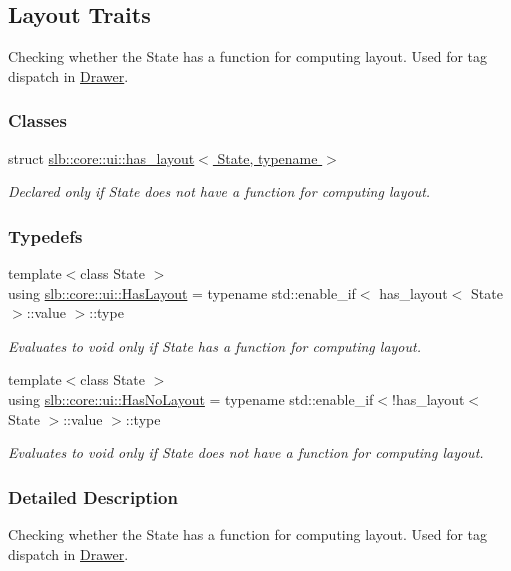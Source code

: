 \hypertarget{group__LayoutTraits}{}\subsection{Layout Traits}
\label{group__LayoutTraits}


Checking whether the State has a function for computing layout. Used for tag dispatch in \hyperlink{structslb_1_1core_1_1ui_1_1Drawer}{Drawer}.  


\subsubsection*{Classes}
\begin{DoxyCompactItemize}
\item 
struct \hyperlink{structslb_1_1core_1_1ui_1_1has__layout}{slb\+::core\+::ui\+::has\+\_\+layout$<$ State, typename $>$}
\begin{DoxyCompactList}\small\item\em Declared only if {\ttfamily State} does not have a function for computing layout. \end{DoxyCompactList}\end{DoxyCompactItemize}
\subsubsection*{Typedefs}
\begin{DoxyCompactItemize}
\item 
{\footnotesize template$<$class State $>$ }\\using \hyperlink{group__LayoutTraits_ga9bf16cc2a70201a2d10994dbffbe094f}{slb\+::core\+::ui\+::\+Has\+Layout} = typename std\+::enable\+\_\+if$<$ has\+\_\+layout$<$ State $>$\+::value $>$\+::type\hypertarget{group__LayoutTraits_ga9bf16cc2a70201a2d10994dbffbe094f}{}\label{group__LayoutTraits_ga9bf16cc2a70201a2d10994dbffbe094f}

\begin{DoxyCompactList}\small\item\em Evaluates to {\ttfamily void} only if {\ttfamily State} has a function for computing layout. \end{DoxyCompactList}\item 
{\footnotesize template$<$class State $>$ }\\using \hyperlink{group__LayoutTraits_gaf200efa9fbb401dd541fa80e687e0264}{slb\+::core\+::ui\+::\+Has\+No\+Layout} = typename std\+::enable\+\_\+if$<$!has\+\_\+layout$<$ State $>$\+::value $>$\+::type\hypertarget{group__LayoutTraits_gaf200efa9fbb401dd541fa80e687e0264}{}\label{group__LayoutTraits_gaf200efa9fbb401dd541fa80e687e0264}

\begin{DoxyCompactList}\small\item\em Evaluates to {\ttfamily void} only if {\ttfamily State} does not have a function for computing layout. \end{DoxyCompactList}\end{DoxyCompactItemize}


\subsubsection{Detailed Description}
Checking whether the State has a function for computing layout. Used for tag dispatch in \hyperlink{structslb_1_1core_1_1ui_1_1Drawer}{Drawer}. 


